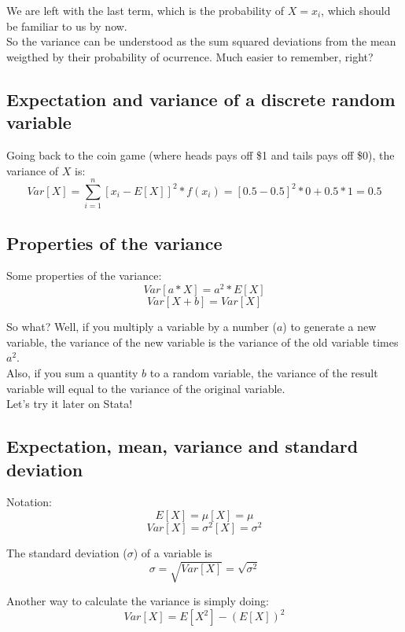 \documentclass[11pt]{article}
\begin{document}
	We are left with the last term, which is the probability of $X = x_i$, which should be familiar to us by now.\\
	
	So the variance can be understood as the sum squared deviations from the mean weigthed by their probability of ocurrence. Much easier to remember, right?

	\subsection*{Expectation and variance of a discrete random variable}
	Going back to the coin game (where heads pays off \$1 and tails pays off \$0), the variance of $X$ is:
	\[Var[X] = \sum\limits_{i=1}^n[x_i - E[X]]^2 * f(x_i) = [0.5 - 0.5]^2 * 0 + 0.5 * 1 = 0.5\]


	\subsection*{Properties of the variance}
	
	Some properties of the variance:
	\[Var[a*X] = a^2 * E[X]\]
	\[Var[X+ b] = Var[X]\]
	
	So what? Well, if you multiply a variable by a number ($a$) to generate a new variable, the variance of the new variable is the variance of the old variable times $a^2$.\\
	
	Also, if you sum a quantity $b$ to a random variable, the variance of the result variable will equal to the variance of the original variable.\\
	
	Let's try it later on Stata!

	\subsection*{Expectation, mean, variance and standard deviation}

	Notation:
	\[E[X] = \mu[X] = \mu\]
	\[Var[X] = \sigma^2[X] = \sigma^2\]

	The standard deviation ($\sigma$) of a variable is
	\[\sigma = \sqrt{Var[X]} = \sqrt{\sigma^2}\]

	Another way to calculate the variance is simply doing: 
	\[Var[X] = E[X^2] - (E[X])^2\]	
\end{document}
